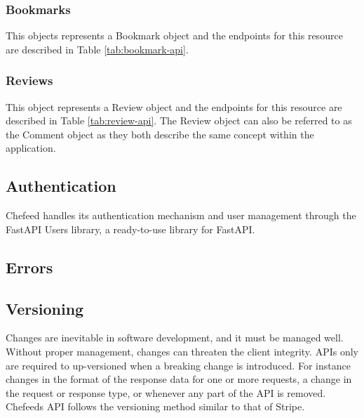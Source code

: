 

\subsubsection{Bookmarks}
This objects represents a Bookmark object and the endpoints for this resource are described in Table \ref{tab:bookmark-api}.



\subsubsection{Reviews}
This object represents a Review object and the endpoints for this resource are described in Table \ref{tab:review-api}. The Review object can also be referred to as the Comment object as they both describe the same concept within the application.



\subsection{Authentication}
Chefeed handles its authentication mechanism and user management through the FastAPI Users library, a ready-to-use library for FastAPI.

\subsection{Errors}

\subsection{Versioning}
Changes are inevitable in software development, and it must be managed well. Without proper management, changes can threaten the client integrity. APIs only are required to up-versioned when a breaking change is introduced. For instance changes in the format of the response data for one or more requests, a change in the request or response type, or whenever any part of the API is removed. Chefeeds API follows the versioning method similar to that of Stripe.

